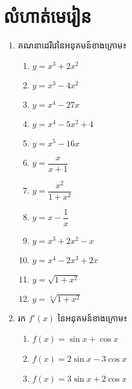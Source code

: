 \documentclass[a4paper,12pt]{article}
\begin{document}
\section{លំហាត់មេរៀន}
\begin{enumerate}
	\item គណនាដេរីវេនៃអនុគមន៍ខាងក្រោម៖
	      \begin{multicols}{2}
		      \begin{enumerate}
			      \item  $y=x^3+2x^2$
			      \item $y=x^3-4x^2$
			      \item $y=x^4-27x$
			      \item $y=x^4 -5x^2 +4$
			      \item $ y=x^5-16x$
			      \item $y= \dfrac{x}{x+1}$
			      \item $y=\dfrac{x^2}{1+x^2}$
			      \item $y=x-\dfrac{1}{x}$
			      \item $y=x^3 +2x^2 -x$
			      \item $ y=x^4 -2x^3 +2x$
			      \item $y= \sqrt{1+x^2}$
			      \item $y=\sqrt[4]{1+x^2}$
		      \end{enumerate}
	      \end{multicols}
	\item រក $f'(x)$ នៃអនុគមន៍ខាងក្រោម៖
	      \begin{multicols}{2}
		      \begin{enumerate}
			      \item $ f (x) = \sin x + \cos x$
			      \item $f(x)=2\sin x-3\cos x$
			      \item $ f(x)=3\sin x+2\cos x$

\end{enumerate}
\end{multicols}
\end{enumerate}
\end{document}
